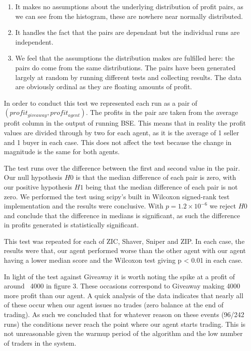 \documentclass{acm_proc_article-sp}
\begin{document}
\begin{enumerate}
\item It makes no assumptions about the underlying
distribution of profit pairs, as we can see from the histogram, these are
nowhere near normally distributed.

\item It handles the fact that the pairs are dependant but the individual runs
are independent.

\item We feel that the assumptions the distribution makes are fulfilled here:
the pairs do come from the same distributions. The pairs have been generated
largely at random by running different tests and collecting results. The data
are obviously ordinal as they are floating amounts of profit.

\end{enumerate}

In order to conduct this test we represented each run as a pair of
$(profit_{giveaway}, profit_{agent})$. The profits in the pair are taken from
the average profit column in the output of running BSE. This means that in
reality the profit values are divided through by two for each agent, as it is
the average of 1 seller and 1 buyer in each case. This does not affect the test
because the change in magnitude is the same for both agents.

The test runs over the difference between the first and second value in the
pair. Our null hypothesis $H0$ is that the median difference of each pair is
zero, with our positive hypothesis $H1$ being that the median difference of
each pair is not zero. We performed the test using scipy's built in Wilcoxon
signed-rank test implementation\cite{scipy:wilcoxon} and the results were
conclusive.  With $p=1.2\times10^{-6}$ we reject $H0$ and conclude
that the difference in medians is significant, as such the difference in
profits generated is statistically significant.

This test was repeated for each of ZIC, Shaver, Sniper and ZIP. In each case,
the results were that, our agent performed worse than the other
agent with our agent having a lower median score and the Wilcoxon test giving
p < 0.01 in each case.

In light of the test against Giveaway it is  worth noting the spike at a profit
of around ~4000 in figure 3.  These occasions correspond to Giveaway making
4000 more profit than our agent. A quick analysis of the data indicates that
nearly all of these occur when our agent issues no trades (zero balance at the
end of trading). As such we concluded that for whatever reason on these events
(96/242 runs) the conditions never reach the point where our agent starts
trading. This is not unreasonable given the warmup period of the algorithm and
the low number of traders in the system.
\end{document}
